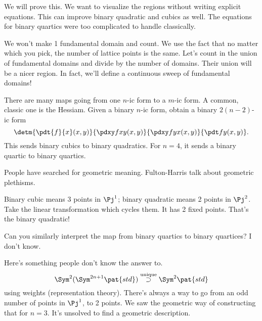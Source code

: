 We will prove this. We want to visualize the regions without writing explicit equations. %
This can improve binary quadratic and cubics as well. The equations for binary quartics were too complicated to handle classically.

We won't make 1 fundamental domain and count. We use the fact that no matter which you pick, the number of lattice points is the same. %
Let's count in the union of fundamental domains and divide by the number of domains. Their union will be a nicer region. In fact, we'll define a continuous sweep of fundamental domains!



There are many maps going from one $n$-ic form to a $m$-ic form. A common, classic one is the Hessiam. Given a binary $n$-ic form, obtain a binary $2(n-2)$-ic form
\[
\detm{\pdt{f}{x}(x,y)}{\pdxy fxy(x,y)}{\pdxy fyx(x,y)}{\pdt fy(x,y)}.
\]
This sends binary cubics to binary quadratics. For $n=4$, it sends a binary quartic to binary quartics. 

People have searched for geometric meaning. Fulton-Harris talk about geometric plethisms.

Binary cubic means 3 points in $\Pj^1$; binary quadratic means 2 points in $\Pj^2$. Take the linear transformation which cycles them. It has 2 fixed points. That's the binary quadratic!

Can you similarly interpret the map from binary quartics to binary quartices? I don't know. 

Here's something people don't know the answer to. 
\[
\Sym^2(\Sym^{2n+1}\pat{std}) \stackrel{\text{unique}}{\supset} \Sym^2\pat{std}
\]
using weights (representation theory).
There's always a way to go from an odd number of points in $\Pj^1$, to 2 points. %
We saw the geometric way of constructing that for $n=3$. It's unsolved to find a geometric description.
